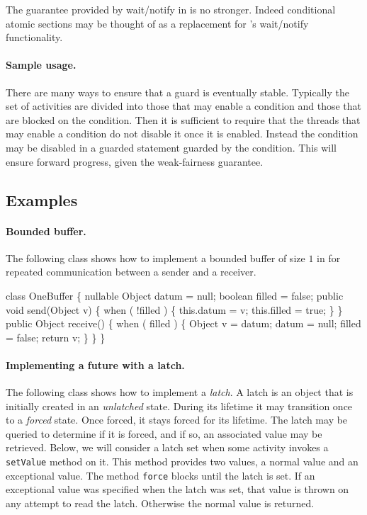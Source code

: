{{\begin{rationale}
The guarantee provided by {\cf wait/notify} in \java{} is no
stronger. Indeed conditional atomic sections may be thought of as a
replacement for \java's wait/notify functionality.
\end{rationale} 

\paragraph{Sample usage.} 
There are many ways to ensure that a guard is eventually
stable. Typically the set of activities are divided into those that
may enable a condition and those that are blocked on the
condition. Then it is sufficient to require that the threads that may
enable a condition do not disable it once it is enabled. Instead the
condition may be disabled in a guarded statement guarded by the
condition. This will ensure forward progress, given the weak-fairness
guarantee.

\subsection{Examples}

\paragraph{Bounded buffer.}
The following class shows how to implement a bounded buffer of size
$1$ in \Xten{} for repeated communication between a sender and a
receiver.

\begin{x10}
class OneBuffer \{
  nullable Object datum = null;
  boolean filled = false;
  public 
    void send(Object v) \{
      when ( !filled ) \{
        this.datum = v;
        this.filled = true;
    \}
 \}
  public
    Object receive() \{
      when ( filled ) \{
        Object v  = datum;
        datum = null;
        filled = false;
        return v;
      \}
  \}
\}
\end{x10}

\paragraph{ Implementing a future with a latch.}\label{future-imp}
The following class shows how to implement a {\em latch}. A latch is
an object that is initially created in an {\em unlatched}
state. During its lifetime it may transition once to a {\em forced}
state. Once forced, it stays forced for its
lifetime. The latch may be queried to determine if it is forced, and
if so, an associated value may be retrieved. Below, we will consider a
latch set when some activity invokes a {\tt setValue} method on
it. This method provides two values, a normal value and an exceptional
value. The method {\tt force} blocks until the latch is set. If an
exceptional value was specified when the latch was set, that value is
thrown on any attempt to read the latch. Otherwise the normal value is
returned.

}}
